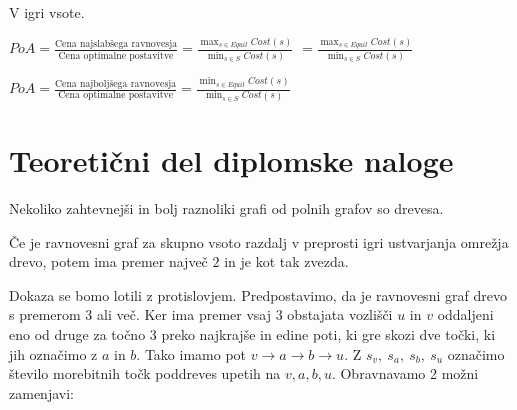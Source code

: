 \documentclass[fin1, tisk]{fmfdelo}
\begin{document}
V igri vsote.

\begin{definicija}
    $PoA = \frac{\text{Cena najslabšega ravnovesja}}{\text{Cena optimalne postavitve}} = \frac{\max_{s\in Equil} Cost(s)}{\min_{s\in S} Cost(s)}$
    $=\frac{\max_{s\in Equil} Cost(s)}{\min_{s\in S} Cost(s)}$
\end{definicija}
\begin{definicija}
    $PoA = \frac{\text{Cena najboljšega ravnovesja}}{\text{Cena optimalne postavitve}} = \frac{\min_{s\in Equil} Cost(s)}{\min_{s\in S} Cost(s)}$
\end{definicija}





\section{Teoretični del diplomske naloge}

Nekoliko zahtevnejši in bolj raznoliki grafi od polnih grafov so drevesa.

\begin{izrek}
Če je ravnovesni graf za skupno vsoto razdalj v preprosti igri ustvarjanja
omrežja drevo, potem ima premer največ $2$ in je kot tak zvezda.
\end{izrek}

\begin{dokaz}
Dokaza se bomo lotili z protislovjem. Predpostavimo, da je ravnovesni graf
drevo s premerom 3 ali več. Ker ima premer vsaj 3 obstajata vozlišči
$u$ in $v$ oddaljeni eno od druge za točno 3 preko najkrajše in edine poti,
ki gre skozi dve točki, ki jih označimo z $a$ in $b$. Tako imamo pot
$v \to a \to b \to u$. Z $s_v,\ s_a,\ s_b,\ s_u$ označimo število morebitnih
točk poddreves upetih na $v, a, b, u$. Obravnavamo 2 možni zamenjavi: 
\end{dokaz}
\end{document}
